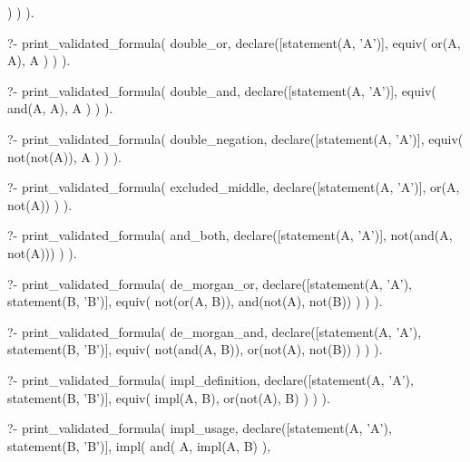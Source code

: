 \begin{fact}
\begin{prolog}
		)
	)
).
\end{prolog}
\begin{prolog}
?- print_validated_formula(
	double_or,
	declare([statement(A, 'A')],
		equiv(
			or(A, A),
			A
		)
	)
).
\end{prolog}
\begin{prolog}
?- print_validated_formula(
	double_and,
	declare([statement(A, 'A')],
		equiv(
			and(A, A),
			A
		)
	)
).
\end{prolog}
\begin{prolog}
?- print_validated_formula(
	double_negation,
	declare([statement(A, 'A')],
		equiv(
			not(not(A)),
			A
		)
	)
).
\end{prolog}
\begin{prolog}
?- print_validated_formula(
	excluded_middle,
	declare([statement(A, 'A')],
		or(A, not(A))
	)
).
\end{prolog}
\begin{prolog}
?- print_validated_formula(
	and_both,
	declare([statement(A, 'A')],
		not(and(A, not(A)))
	)
).
\end{prolog}
\begin{prolog}
?- print_validated_formula(
	de_morgan_or,
	declare([statement(A, 'A'), statement(B, 'B')],
		equiv(
			not(or(A, B)),
			and(not(A), not(B))
		)
	)
).
\end{prolog}
\begin{prolog}
?- print_validated_formula(
	de_morgan_and,
	declare([statement(A, 'A'), statement(B, 'B')],
		equiv(
			not(and(A, B)),
			or(not(A), not(B))
		)
	)
).
\end{prolog}
\begin{prolog}
?- print_validated_formula(
	impl_definition,
	declare([statement(A, 'A'), statement(B, 'B')],
		equiv(
			impl(A, B),
			or(not(A), B)
		)
	)
).
\end{prolog}
\begin{prolog}
?- print_validated_formula(
	impl_usage,
	declare([statement(A, 'A'), statement(B, 'B')],
		impl(
			and(
				A,
				impl(A, B)
			),

\end{prolog}
\end{fact}
